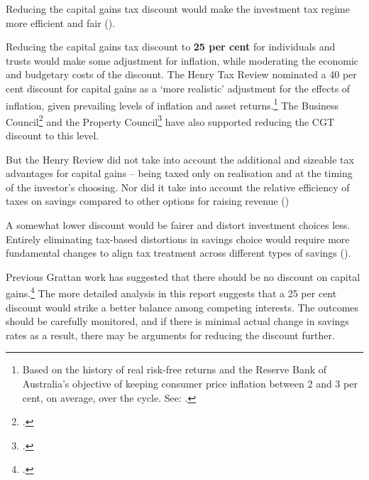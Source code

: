 \documentclass{grattanAlpha}\usepackage[]{graphicx}\usepackage[]{color}
\begin{document}
Reducing the capital gains tax discount would make the investment tax regime more efficient and fair (). 

Reducing the capital gains tax discount to \textbf{25 per cent} for individuals and trusts would make some adjustment for inflation, while moderating the economic and budgetary costs of the discount. The Henry Tax Review nominated a 40 per cent discount for capital gains as a ‘more realistic’ adjustment for the effects of inflation, given prevailing levels of inflation and asset returns.\footnote{Based on the history of real risk-free returns and the Reserve Bank of Australia’s objective of keeping consumer price inflation between 2 and 3 per cent, on average, over the cycle. See: \textcite[][72]{HenryTaxReview2010}.}  The Business Council\footcite[][64]{BCA2016}  and the Property Council\footcite{Vickery2016}  have also supported reducing the CGT discount to this level. 

But the Henry Review did not take into account the additional and sizeable tax advantages for capital gains – being taxed only on realisation and at the timing of the investor’s choosing. Nor did it take into account the relative efficiency of taxes on savings compared to other options for raising revenue ()

A somewhat lower discount would be fairer and distort investment choices less. 
Entirely eliminating tax-based distortions in savings choice would require more fundamental changes to align tax treatment across different types of savings (). 

Previous Grattan work has suggested that there should be no discount on capital gains.\footcite[][40--43]{DaleyMcGannonSavage2013}  
The more detailed analysis in this report suggests that a 25 per cent discount would strike a better balance among competing interests. The outcomes should be carefully monitored, and if there is minimal actual change in savings rates as a result, there may be arguments for reducing the discount further.
\end{document}
